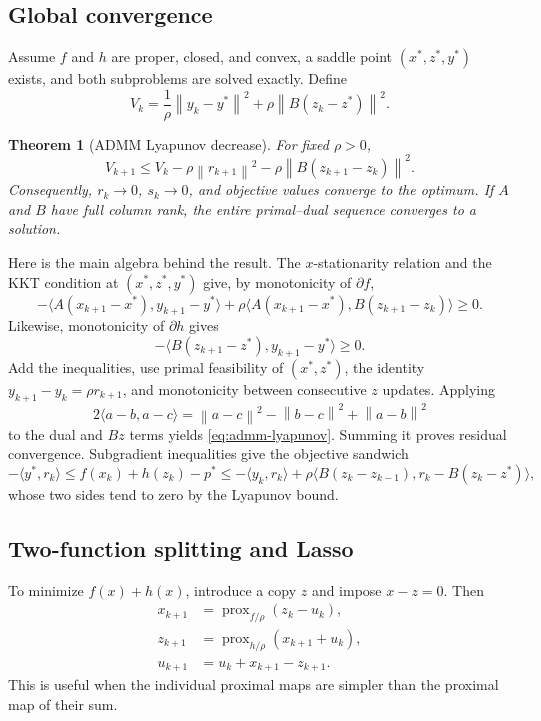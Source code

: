 \documentclass[12pt,oneside]{book}
\numberwithin{equation}{section}
\theoremstyle{definition}
\theoremstyle{plain}
\newtheorem{theorem}{Theorem}[section]
\theoremstyle{remark}
\newcommand{\norm}[1]{\left\lVert #1 \right\rVert}
\begin{document}
\subsection{Global convergence}

Assume $f$ and $h$ are proper, closed, and convex, a saddle point
$(x^*,z^*,y^*)$ exists, and both subproblems are solved exactly. Define
\[
 V_k=\frac1\rho\norm{y_k-y^*}^2
       +\rho\norm{B(z_k-z^*)}^2.
\]

\begin{theorem}[ADMM Lyapunov decrease]
For fixed $\rho>0$,
\begin{equation}\label{eq:admm-lyapunov}
 V_{k+1}\leq V_k-\rho\norm{r_{k+1}}^2
 -\rho\norm{B(z_{k+1}-z_k)}^2.
\end{equation}
Consequently, $r_k\to0$, $s_k\to0$, and objective values converge to the
optimum. If $A$ and $B$ have full column rank, the entire primal--dual
sequence converges to a solution.
\end{theorem}

Here is the main algebra behind the result. The $x$-stationarity relation and
the KKT condition at $(x^*,z^*,y^*)$ give, by monotonicity of $\partial f$,
\[
 -\langle A(x_{k+1}-x^*),y_{k+1}-y^*\rangle
 +\rho\langle A(x_{k+1}-x^*),B(z_{k+1}-z_k)\rangle\geq0.
\]
Likewise, monotonicity of $\partial h$ gives
\[
 -\langle B(z_{k+1}-z^*),y_{k+1}-y^*\rangle\geq0.
\]
Add the inequalities, use primal feasibility of $(x^*,z^*)$, the identity
$y_{k+1}-y_k=\rho r_{k+1}$, and monotonicity between consecutive $z$ updates.
Applying
\[
 2\langle a-b,a-c\rangle
 =\norm{a-c}^2-\norm{b-c}^2+\norm{a-b}^2
\]
to the dual and $Bz$ terms yields \eqref{eq:admm-lyapunov}. Summing it proves
residual convergence. Subgradient inequalities give the objective sandwich
\[
 -\langle y^*,r_k\rangle\leq f(x_k)+h(z_k)-p^*
 \leq-\langle y_k,r_k\rangle
 +\rho\langle B(z_k-z_{k-1}),r_k-B(z_k-z^*)\rangle,
\]
whose two sides tend to zero by the Lyapunov bound.

\subsection{Two-function splitting and Lasso}

To minimize $f(x)+h(x)$, introduce a copy $z$ and impose $x-z=0$. Then
\begin{align*}
 x_{k+1}&=\operatorname{prox}_{f/\rho}(z_k-u_k),\\
 z_{k+1}&=\operatorname{prox}_{h/\rho}(x_{k+1}+u_k),\\
 u_{k+1}&=u_k+x_{k+1}-z_{k+1}.
\end{align*}
This is useful when the individual proximal maps are simpler than the
proximal map of their sum.
\end{document}
